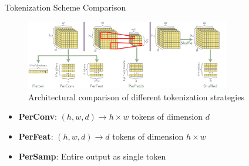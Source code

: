 \documentclass{beamer}
\begin{document}
\begin{frame}{Tokenization Scheme Comparison}
  \begin{figure}
    \centering
    \includegraphics[width=0.8\textwidth]{Don_t_flatten_tokenize/figures/tokenizationSchemes.pdf}
    \caption{Architectural comparison of different tokenization strategies}
  \end{figure}
  
  \begin{itemize}
    \item \textbf{PerConv}: $(h,w,d) \rightarrow h \times w$ tokens of dimension $d$
    \item \textbf{PerFeat}: $(h,w,d) \rightarrow d$ tokens of dimension $h \times w$
    \item \textbf{PerSamp}: Entire output as single token
  \end{itemize}
\end{frame}
\end{document}
